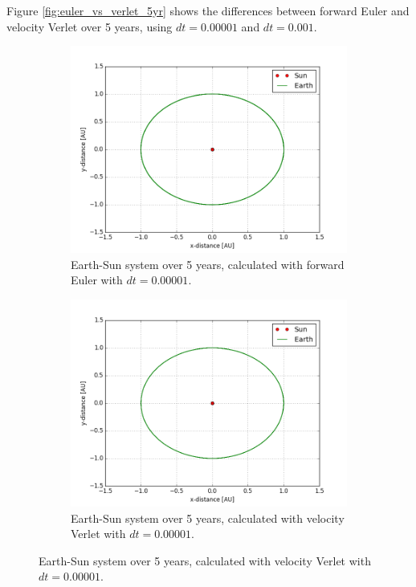\documentclass[10pt,showpacs,preprintnumbers,footinbib,amsmath,amssymb,aps,prl,twocolumn,groupedaddress,superscriptaddress,showkeys]{revtex4-1}
\begin{document}
Figure \ref{fig:euler_vs_verlet_5yr} shows the differences between forward Euler and velocity Verlet over 5 years, using $dt = 0.00001$ and $dt = 0.001$.

\begin{figure}
	\centering
	\begin{subfigure}[b]{0.3\textwidth}
		\includegraphics[width=\textwidth]{earth_sun_euler_5years_dt0_00001.png}
		\caption{Earth-Sun system over 5 years, calculated with forward Euler with $dt = 0.00001$.}
		\label{fig:e_s_euler_5yr_dt0_00001}
	\end{subfigure}
    \begin{subfigure}[b]{0.3\textwidth}
		\includegraphics[width=\textwidth]{earth_sun_verlet_5years_dt0_00001.png}
		\caption{Earth-Sun system over 5 years, calculated with velocity Verlet with $dt = 0.00001$.}
		\label{fig:e_s_verlet_5yr_dt0_00001}
	\end{subfigure}
	

\end{figure}
\end{document}
